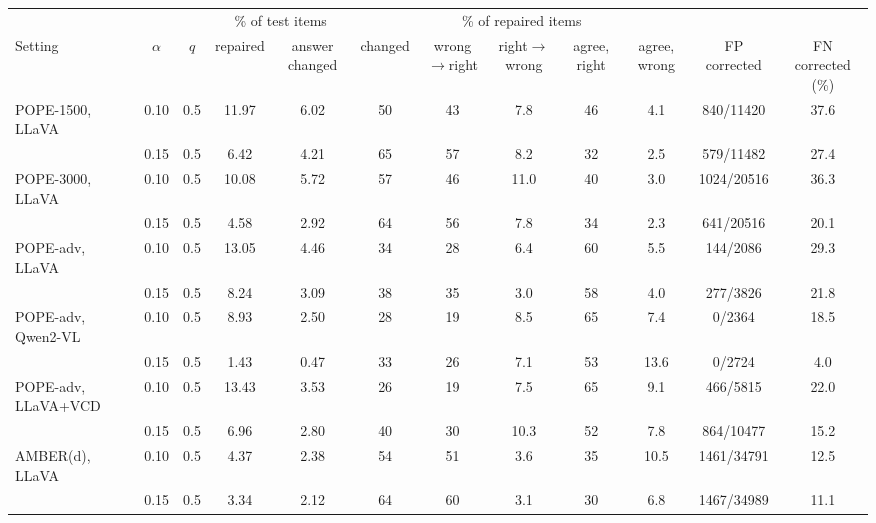 \begin{tabular}{lccccccccccc}
\toprule
 & & & \multicolumn{2}{c}{\% of test items} & \multicolumn{5}{c}{\% of repaired items} & & \\
\cmidrule(lr){4-5}\cmidrule(lr){6-10}
Setting & $\alpha$ & $q$ & repaired & answer changed & changed & wrong$\to$right & right$\to$wrong & agree, right & agree, wrong & FP corrected & FN corrected (\%)\\
\midrule
POPE-1500, LLaVA & 0.10 & 0.5 & 11.97 & 6.02 & 50 & 43 & 7.8 & 46 & 4.1 & 840/11420 & 37.6\\
 & 0.15 & 0.5 & 6.42 & 4.21 & 65 & 57 & 8.2 & 32 & 2.5 & 579/11482 & 27.4\\
\addlinespace
POPE-3000, LLaVA & 0.10 & 0.5 & 10.08 & 5.72 & 57 & 46 & 11.0 & 40 & 3.0 & 1024/20516 & 36.3\\
 & 0.15 & 0.5 & 4.58 & 2.92 & 64 & 56 & 7.8 & 34 & 2.3 & 641/20516 & 20.1\\
\addlinespace
POPE-adv, LLaVA & 0.10 & 0.5 & 13.05 & 4.46 & 34 & 28 & 6.4 & 60 & 5.5 & 144/2086 & 29.3\\
 & 0.15 & 0.5 & 8.24 & 3.09 & 38 & 35 & 3.0 & 58 & 4.0 & 277/3826 & 21.8\\
\addlinespace
POPE-adv, Qwen2-VL & 0.10 & 0.5 & 8.93 & 2.50 & 28 & 19 & 8.5 & 65 & 7.4 & 0/2364 & 18.5\\
 & 0.15 & 0.5 & 1.43 & 0.47 & 33 & 26 & 7.1 & 53 & 13.6 & 0/2724 & 4.0\\
\addlinespace
POPE-adv, LLaVA+VCD & 0.10 & 0.5 & 13.43 & 3.53 & 26 & 19 & 7.5 & 65 & 9.1 & 466/5815 & 22.0\\
 & 0.15 & 0.5 & 6.96 & 2.80 & 40 & 30 & 10.3 & 52 & 7.8 & 864/10477 & 15.2\\
\addlinespace
AMBER(d), LLaVA & 0.10 & 0.5 & 4.37 & 2.38 & 54 & 51 & 3.6 & 35 & 10.5 & 1461/34791 & 12.5\\
 & 0.15 & 0.5 & 3.34 & 2.12 & 64 & 60 & 3.1 & 30 & 6.8 & 1467/34989 & 11.1\\
\bottomrule
\end{tabular}
